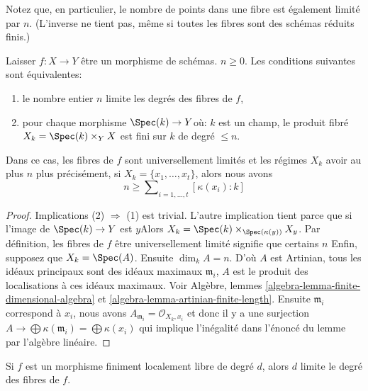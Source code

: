 \noindent
Notez que, en particulier, le nombre de points dans une fibre est également limité par $n$. (L'inverse ne tient pas, même si toutes les fibres sont des schémas réduits finis.)

\begin{lemma}

\label{lemma-characterize-universally-bounded}

Laisser $f : X \to Y$ être un morphisme de schémas. $n \geq 0$. Les conditions suivantes sont équivalentes:

\begin{enumerate}

\item le nombre entier $n$ limite les degrés des fibres de $f$,
\item pour chaque morphisme $\Spec(k) \to Y$où: $k$ est un champ, le produit fibré $X_k = \Spec(k) \times_Y X$ est fini sur $k$
de degré $\leq n$.

\end{enumerate}

Dans ce cas, les fibres de $f$ sont universellement limités et les régimes
$X_k$ avoir au plus $n$ plus précisément, si
$X_k = \{x_1, \ldots, x_t\}$, alors nous avons
$$
n \geq \sum\nolimits_{i = 1, \ldots, t} [\kappa(x_i) : k]
$$

\end{lemma}

\begin{proof}

Implications (2) $\Rightarrow$ (1) est trivial. L'autre implication tient parce que si l'image de $\Spec(k) \to Y$ est $y$Alors
$X_k = \Spec(k) \times_{\Spec(\kappa(y))} X_y$. Par définition, les fibres de $f$ être universellement limité signifie que certains $n$ Enfin, supposez que $X_k = \Spec(A)$. Ensuite $\dim_k A = n$. D'où $A$ est Artinian, tous les idéaux principaux sont des idéaux maximaux $\mathfrak m_i$, $A$ est le produit des localisations à ces idéaux maximaux. Voir Algèbre, lemmes \ref{algebra-lemma-finite-dimensional-algebra}
et \ref{algebra-lemma-artinian-finite-length}. Ensuite $\mathfrak m_i$
correspond à $x_i$, nous avons
$A_{\mathfrak m_i} = \mathcal{O}_{X_k, x_i}$
et donc il y a une surjection
$A \to  \bigoplus \kappa(\mathfrak m_i) = \bigoplus \kappa(x_i)$
qui implique l'inégalité dans l'énoncé du lemme par l'algèbre linéaire.

\end{proof}

\begin{lemma}

\label{lemma-finite-locally-free-universally-bounded}
Si $f$ est un morphisme finiment localement libre de degré $d$, alors $d$ limite le degré des fibres de $f$.
\end{lemma}

